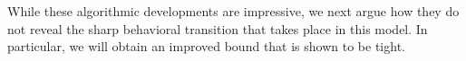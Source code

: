 \documentclass[english]{article}
\newcommand{\1}{\textbf{1}}
\begin{document}
While these algorithmic developments are impressive, we next argue how they do not reveal the sharp behavioral transition that takes place in this model. In particular, we will obtain an improved bound that is shown to be tight. 

\end{document}
